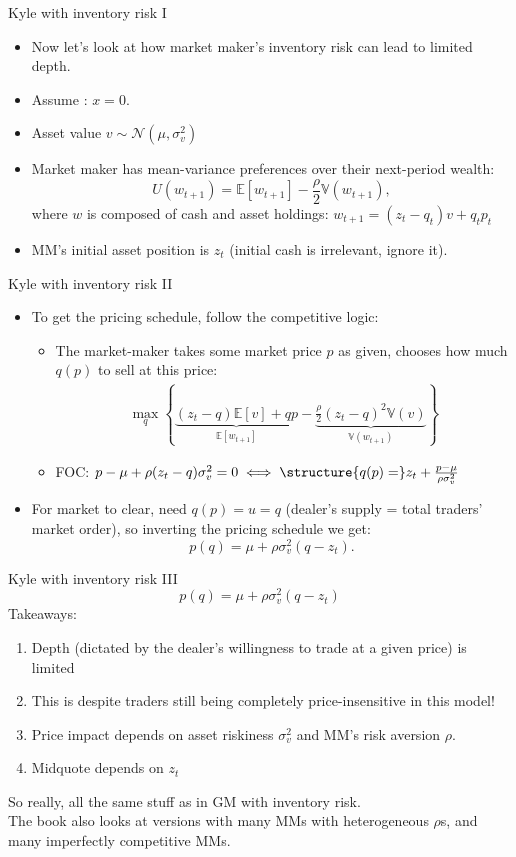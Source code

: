 \documentclass[english,10pt
,aspectratio=169
]{beamer}
\begin{document}
\begin{frame}{Kyle with inventory risk I}
\begin{itemize}
	\item Now let's look at how market maker's \alert{inventory risk} can lead to limited depth.
	\item Assume : $x = 0$.
	\item Asset value $v \sim \mathcal{N}(\mu, \sigma^2_v)$
	\item Market maker has mean-variance preferences over their next-period wealth:
	\[
	U(w_{t+1})=\mathbb{E}[w_{t+1}] - \frac{\rho}{2} \mathbb{V}(w_{t+1}),
	\]
	where $w$ is composed of cash and asset holdings: $w_{t+1} = (z_t - q_t) v + q_t p_t$
	\item MM's initial asset position is $z_t$ (initial cash is irrelevant, ignore it).
\end{itemize}
\end{frame}


\begin{frame}{Kyle with inventory risk II}
\begin{itemize}
	\item To get the pricing schedule, follow the competitive logic:
	\begin{itemize}
		\item The market-maker takes some market price $p$ as given, chooses how much $q(p)$ to sell at this price:
		\begin{align*}
			\max_q \left\{ \underbrace{(z_t-q)\mathbb{E}[v] + qp}_{\mathbb{E}[w_{t+1}]} - \underbrace{\frac{\rho}{2} (z_t-q)^2 \mathbb{V}(v) }_{ \mathbb{V}(w_{t+1})} \right\}
		\end{align*}
		\item FOC: $p - \mu + \rho (z_t-q) \sigma_v^2 = 0 \iff \structure{q(p) =} z_t + \frac{p - \mu}{\rho \sigma_v^2}$
	\end{itemize}
	\item For market to clear, need $q(p) = u = q$ (dealer's supply = total traders' market order), so inverting the pricing schedule we get: 
	$$p(q) = \mu + \rho \sigma_v^2 (q - z_t).$$
\end{itemize}
\end{frame}


\begin{frame}{Kyle with inventory risk III}
$$p(q) = \mu + \rho \sigma_v^2 (q - z_t)$$
Takeaways:
\begin{enumerate}
	\item Depth (dictated by the dealer's willingness to trade at a given price) is limited 
	\item This is despite traders still being completely price-insensitive in this model!
	\item Price impact depends on asset riskiness $\sigma_v^2$ and MM's risk aversion $\rho$.
	\item Midquote depends on $z_t$
\end{enumerate}
So really, all the same stuff as in GM with inventory risk.
\\ The book also looks at versions with many MMs with heterogeneous $\rho$s, and many imperfectly competitive MMs.
\end{frame}
\end{document}

